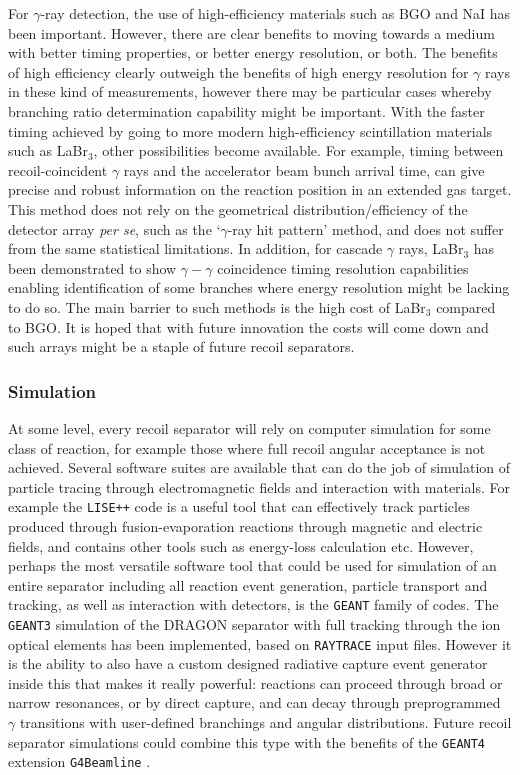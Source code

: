 For $\gamma$-ray detection, the use of high-efficiency materials such as BGO and NaI has been important. However, there are clear benefits to moving towards a medium with better timing properties, or better energy resolution, or both. The benefits of high efficiency clearly outweigh the benefits of high energy resolution for $\gamma$ rays in these kind of measurements, however there may be particular cases whereby branching ratio determination capability might be important. With the faster timing achieved by going to more modern high-efficiency scintillation materials such as LaBr$_3$, other possibilities become available. For example, timing between recoil-coincident $\gamma$ rays and the accelerator beam bunch arrival time, can give precise and robust information on the reaction position in an extended gas target. This method does not rely on the geometrical distribution/efficiency of the detector array {\em per se}, such as the `$\gamma$-ray hit pattern' method, and does not suffer from the same statistical limitations. In addition, for cascade $\gamma$ rays, LaBr$_3$ has been demonstrated to show $\gamma-\gamma$ coincidence timing resolution capabilities enabling identification of some branches where energy resolution might be lacking to do so. The main barrier to such methods is the high cost of LaBr$_3$ compared to BGO. It is hoped that with future innovation the costs will come down and such arrays might be a staple of future recoil separators. 

\subsubsection{Simulation}

At some level, every recoil separator will rely on computer simulation for some class of reaction, for example those where full recoil angular acceptance is not achieved. Several software suites are available that can do the job of simulation of particle tracing through electromagnetic fields and interaction with materials. For example the \texttt{LISE++} code \cite{lise++} is a useful tool that can effectively track particles produced through fusion-evaporation reactions through magnetic and electric fields, and contains other tools such as energy-loss calculation etc. However, perhaps the most versatile software tool that could be used for simulation of an entire separator including all reaction event generation, particle transport and tracking, as well as interaction with detectors, is the \texttt{GEANT} family of codes. The \texttt{GEANT3} \cite{geant3} simulation of the DRAGON separator with full tracking through the ion optical elements has been implemented, based on \texttt{RAYTRACE} input files. However it is the ability to also have a custom designed radiative capture event generator inside this that makes it really powerful: reactions can proceed through broad or narrow resonances, or by direct capture, and can decay through preprogrammed $\gamma$ transitions with user-defined branchings and angular distributions. Future recoil separator simulations could combine this type with the benefits of the \texttt{GEANT4} extension \texttt{G4Beamline} \cite{geant4}. 

